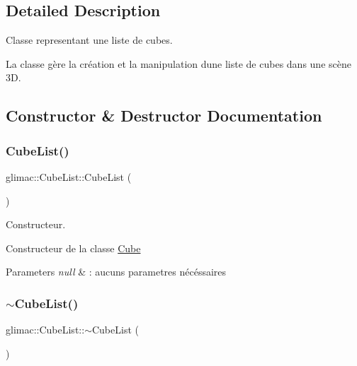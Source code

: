 \subsection{Detailed Description}
Classe representant une liste de cubes. 

La classe gère la création et la manipulation d\textquotesingle{}une liste de cubes dans une scène 3D. 

\subsection{Constructor \& Destructor Documentation}
\mbox{\label{classglimac_1_1CubeList_a27f9622967bd19bcb34b3095fbb55ff6}} 
\subsubsection{\texorpdfstring{Cube\+List()}{CubeList()}}
{\footnotesize\ttfamily glimac\+::\+Cube\+List\+::\+Cube\+List (\begin{DoxyParamCaption}{ }\end{DoxyParamCaption})}



Constructeur. 

Constructeur de la classe \hyperlink{classglimac_1_1Cube}{Cube}


\begin{DoxyParams}{Parameters}
{\em null} & \+: aucuns parametres nécéssaires \\
\hline
\end{DoxyParams}
\mbox{\label{classglimac_1_1CubeList_aca9014a89b4f853e301a2821b6d881d9}} 
\subsubsection{\texorpdfstring{$\sim$\+Cube\+List()}{~CubeList()}}
{\footnotesize\ttfamily glimac\+::\+Cube\+List\+::$\sim$\+Cube\+List (\begin{DoxyParamCaption}{ }\end{DoxyParamCaption})}




